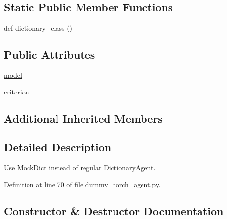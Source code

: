 \subsection*{Static Public Member Functions}
\begin{DoxyCompactItemize}
\item 
def \hyperlink{classparlai_1_1agents_1_1test__agents_1_1dummy__torch__agent_1_1MockTorchAgent_a122bde825e09b1450578a7ab7d606bfd}{dictionary\+\_\+class} ()
\end{DoxyCompactItemize}
\subsection*{Public Attributes}
\begin{DoxyCompactItemize}
\item 
\hyperlink{classparlai_1_1agents_1_1test__agents_1_1dummy__torch__agent_1_1MockTorchAgent_afebdb752bdbb212a078b4bdee5d9f45f}{model}
\item 
\hyperlink{classparlai_1_1agents_1_1test__agents_1_1dummy__torch__agent_1_1MockTorchAgent_a229d18c3a8eb8512c29feca34fed43b7}{criterion}
\end{DoxyCompactItemize}
\subsection*{Additional Inherited Members}


\subsection{Detailed Description}
\begin{DoxyVerb}Use MockDict instead of regular DictionaryAgent.\end{DoxyVerb}
 

Definition at line 70 of file dummy\+\_\+torch\+\_\+agent.\+py.



\subsection{Constructor \& Destructor Documentation}
\mbox{\label{classparlai_1_1agents_1_1test__agents_1_1dummy__torch__agent_1_1MockTorchAgent_af14024f59e4ea3dea5c7ff38caff89ad}} 
